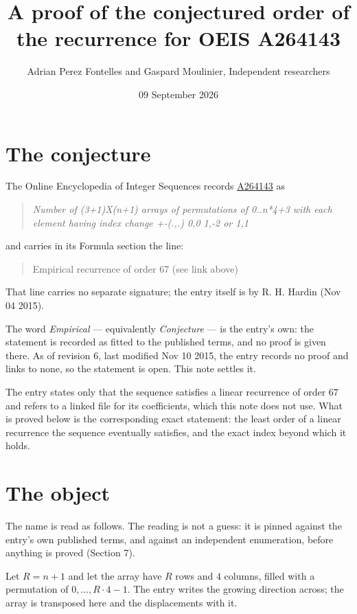 \documentclass[11pt]{article}
\title{A proof of the conjectured order of the recurrence for OEIS A264143}
\author{Adrian Perez Fontelles and Gaspard Moulinier, Independent researchers}
\date{09 September 2026}
\theoremstyle{definition}
\begin{document}
\maketitle
\section{The conjecture}

The Online Encyclopedia of Integer Sequences records \href{https://oeis.org/A264143}{A264143} as

\begin{quote}\itshape Number of (3+1)X(n+1) arrays of permutations of 0..n*4+3 with each element having index change +-(.,.) 0,0 1,-2 or 1,1\end{quote}

and carries in its Formula section the line:

\begin{quote}\ttfamily Empirical recurrence of order 67 (see link above)\end{quote}

That line carries no separate signature; the entry itself is by R. H. Hardin (Nov 04 2015).

The word {\itshape Empirical} --- equivalently {\itshape Conjecture} --- is the entry's own: the statement is recorded as fitted to the published terms, and no proof is given there. As of revision 6, last modified Nov 10 2015, the entry records no proof and links to none, so the statement is open. This note settles it.

The entry states only that the sequence satisfies a linear recurrence of order $67$ and refers to a linked file for its coefficients, which this note does not use. What is proved below is the corresponding exact statement: the least order of a linear recurrence the sequence eventually satisfies, and the exact index beyond which it holds.

\section{The object}

The name is read as follows. The reading is not a guess: it is pinned against the entry's own published terms, and against an independent enumeration, before anything is proved (Section 7).

Let $R = n + 1$ and let the array have $R$ rows and $4$ columns, filled with a permutation of $0,\dots,R\cdot4-1$. The entry writes the growing direction across; the array is transposed here and the displacements with it.
\end{document}

